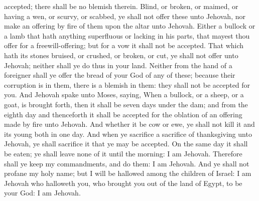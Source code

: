 accepted; there shall be no blemish therein. Blind, or broken, or maimed, or having a wen, or scurvy, or scabbed, ye shall not offer these unto Jehovah, nor make an offering by fire of them upon the altar unto Jehovah. Either a bullock or a lamb that hath anything superfluous or lacking in his parts, that mayest thou offer for a freewill-offering; but for a vow it shall not be accepted. That which hath its stones bruised, or crushed, or broken, or cut, ye shall not offer unto Jehovah; neither shall ye do thus in your land. Neither from the hand of a foreigner shall ye offer the bread of your God of any of these; because their corruption is in them, there is a blemish in them: they shall not be accepted for you.  And Jehovah spake unto Moses, saying, When a bullock, or a sheep, or a goat, is brought forth, then it shall be seven days under the dam; and from the eighth day and thenceforth it shall be accepted for the oblation of an offering made by fire unto Jehovah. And whether it be cow or ewe, ye shall not kill it and its young both in one day. And when ye sacrifice a sacrifice of thanksgiving unto Jehovah, ye shall sacrifice it that ye may be accepted. On the same day it shall be eaten; ye shall leave none of it until the morning: I am Jehovah. Therefore shall ye keep my commandments, and do them: I am Jehovah. And ye shall not profane my holy name; but I will be hallowed among the children of Israel: I am Jehovah who halloweth you, who brought you out of the land of Egypt, to be your God: I am Jehovah. 

